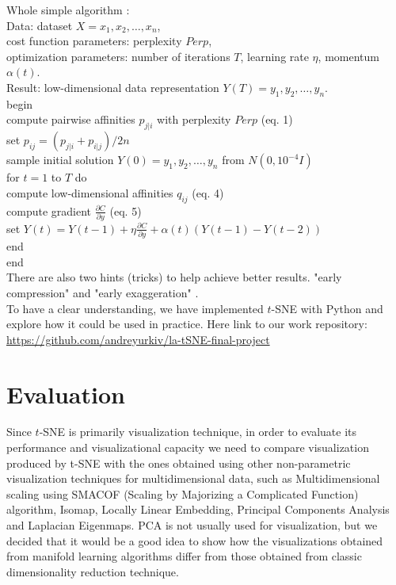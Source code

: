 Whole simple algorithm \cite{tsnearticle}:\\
Data: dataset $X = {x_1, x_2, \dots, x_n}$,\\
cost function parameters: perplexity $Perp$,\\
optimization parameters: number of iterations $T$, learning rate $\eta$, momentum $\alpha(t)$.\\
Result: low-dimensional data representation $Y(T) = {y_1, y_2, \dots, y_n}$.\\
begin\\
\hspace*{1cm}compute pairwise affinities $p_{j|i}$ with perplexity $Perp$ (eq. 1)\\
\hspace*{1cm}set $p_{ij} = (p_{j|i} + p_{i|j})/2n$\\
\hspace*{1cm}sample initial solution $Y(0) = {y_1, y_2, \dots, y_n}$ from $N(0, 10^{-4}I)$\\
\hspace*{1cm}for $t = 1$ to $T$ do\\
\hspace*{2cm}compute low-dimensional affinities $q_{ij}$ (eq. 4)\\
\hspace*{2cm}compute gradient $\frac{\partial C}{\partial y}$ (eq. 5)\\
\hspace*{2cm}set $Y(t) = Y(t-1) + \eta \frac{\partial C}{\partial y} + \alpha(t)(Y(t-1) - Y(t-2))$\\
\hspace*{1cm}end\\
end\\

There are also two hints (tricks) to help achieve better results. "early compression" and "early exaggeration" \cite{tsnearticle}.\\

To have a clear understanding, we have implemented $t$-SNE with Python and explore how it could be used in practice. Here link to our work repository:\\

\url{https://github.com/andreyurkiv/la-tSNE-final-project}

\section{Evaluation}

Since $t$-SNE is primarily visualization technique, in order to evaluate its performance and visualizational capacity we need to compare visualization produced by t-SNE with the ones obtained using other non-parametric visualization techniques for multidimensional data, such as Multidimensional scaling using SMACOF (Scaling by Majorizing a Complicated Function) algorithm, Isomap, Locally Linear Embedding, Principal Components Analysis and Laplacian Eigenmaps. PCA is not usually used for visualization, but we decided that it would be a good idea to show how the visualizations obtained from manifold learning algorithms differ from those obtained from classic dimensionality reduction technique.\\

